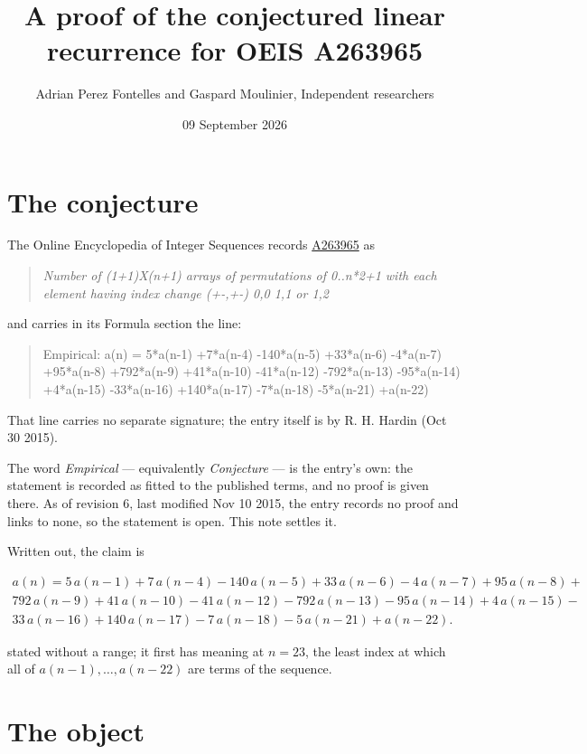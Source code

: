 \documentclass[11pt]{article}
\title{A proof of the conjectured linear recurrence for OEIS A263965}
\author{Adrian Perez Fontelles and Gaspard Moulinier, Independent researchers}
\date{09 September 2026}
\theoremstyle{definition}
\begin{document}
\maketitle
\section{The conjecture}

The Online Encyclopedia of Integer Sequences records \href{https://oeis.org/A263965}{A263965} as

\begin{quote}\itshape Number of (1+1)X(n+1) arrays of permutations of 0..n*2+1 with each element having index change (+-,+-) 0,0 1,1 or 1,2\end{quote}

and carries in its Formula section the line:

\begin{quote}\ttfamily Empirical: a(n) = 5*a(n-1) +7*a(n-4) -140*a(n-5) +33*a(n-6) -4*a(n-7) +95*a(n-8) +792*a(n-9) +41*a(n-10) -41*a(n-12) -792*a(n-13) -95*a(n-14) +4*a(n-15) -33*a(n-16) +140*a(n-17) -7*a(n-18) -5*a(n-21) +a(n-22)\end{quote}

That line carries no separate signature; the entry itself is by R. H. Hardin (Oct 30 2015).

The word {\itshape Empirical} --- equivalently {\itshape Conjecture} --- is the entry's own: the statement is recorded as fitted to the published terms, and no proof is given there. As of revision 6, last modified Nov 10 2015, the entry records no proof and links to none, so the statement is open. This note settles it.

Written out, the claim is

\begin{multline*} a(n) = 5\,a(n-1) + 7\,a(n-4) - 140\,a(n-5) + 33\,a(n-6) - 4\,a(n-7) + 95\,a(n-8) + \\ 792\,a(n-9) + 41\,a(n-10) - 41\,a(n-12) - 792\,a(n-13) - 95\,a(n-14) + 4\,a(n-15) - \\ 33\,a(n-16) + 140\,a(n-17) - 7\,a(n-18) - 5\,a(n-21) + a(n-22). \end{multline*}

stated without a range; it first has meaning at $n = 23$, the least index at which all of $a(n-1),\dots,a(n-22)$ are terms of the sequence.

\section{The object}
\end{document}
